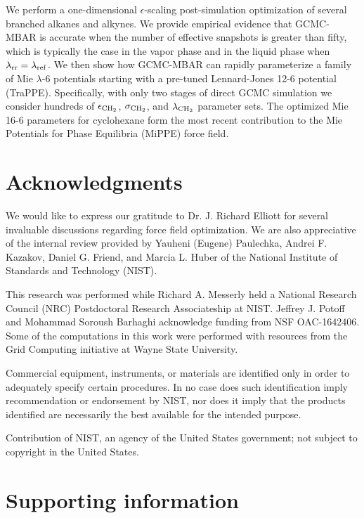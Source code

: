 \documentclass[journal=jced,manuscript=article]{achemso}
\begin{document}
We perform a one-dimensional $\epsilon$-scaling post-simulation optimization of several branched alkanes and alkynes. We provide empirical evidence that GCMC-MBAR is accurate when the number of effective snapshots is greater than fifty, which is typically the case in the vapor phase and in the liquid phase when $\lambda_{\rm rr} = \lambda_{\rm ref}$. We then show how GCMC-MBAR can rapidly parameterize a family of Mie $\lambda$-6 potentials starting with a pre-tuned Lennard-Jones 12-6 potential (TraPPE). Specifically, with only two stages of direct GCMC simulation we consider hundreds of $\epsilon_{\rm CH_2}$, $\sigma_{\rm CH_2}$, and $\lambda_{\rm CH_2}$ parameter sets. The optimized Mie 16-6 parameters for cyclohexane form the most recent contribution to the Mie Potentials for Phase Equilibria (MiPPE) force field.

\section*{Acknowledgments}

We would like to express our gratitude to Dr. J. Richard Elliott for several invaluable discussions regarding force field optimization. We are also appreciative of the internal review provided by Yauheni (Eugene) Paulechka, Andrei F. Kazakov, Daniel G. Friend, and Marcia L. Huber of the National Institute of Standards and Technology (NIST).

This research was performed while Richard A. Messerly held a National Research Council (NRC) Postdoctoral Research Associateship at NIST. Jeffrey J. Potoff and Mohammad Soroush Barhaghi acknowledge funding from NSF OAC-1642406. Some of the computations in this work were performed with resources from the Grid Computing initiative at Wayne State University. 

Commercial equipment, instruments, or materials are identified only in order to adequately specify certain procedures. In no case does such identification imply recommendation or endorsement by NIST, nor does it imply that the products identified are necessarily the best available for the intended purpose.

Contribution of NIST, an agency of the United States government; not subject to copyright in the United States.

\section*{Supporting information}
\end{document}
